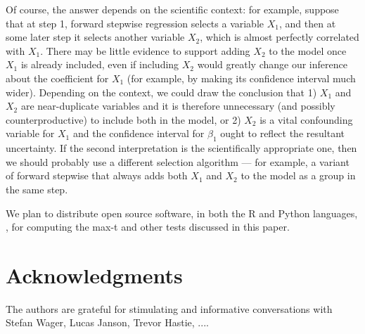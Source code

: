 \documentclass{article}
\begin{document}
Of course, the answer depends on the scientific context: for example, suppose that at step 1, forward stepwise regression selects a variable $X_1$, and then at some later step it selects another variable $X_2$, which is almost perfectly correlated with $X_1$. There may be little evidence to support adding $X_2$ to the model once $X_1$ is already included, even if including $X_2$ would greatly change our inference about the coefficient for $X_1$ (for example, by making its confidence interval much wider). Depending on the context, we could draw the conclusion that 1) $X_1$ and $X_2$ are near-duplicate variables and it is therefore unnecessary (and possibly counterproductive) to include both in the model, or 2) $X_2$ is a vital confounding variable for $X_1$ and the confidence interval for $\beta_1$ ought to reflect the resultant uncertainty. If the second interpretation is the scientifically appropriate one, then we should probably use a different selection algorithm --- for example, a variant of forward stepwise that always adds both $X_1$ and $X_2$ to the model as a group in the same step.

We plan to distribute  open source software, in both the R and Python languages, , for computing the max-t and other tests discussed in this paper.




\section*{Acknowledgments}

The authors are grateful for stimulating and informative conversations with Stefan Wager, Lucas Janson, Trevor Hastie, ....



\end{document}
